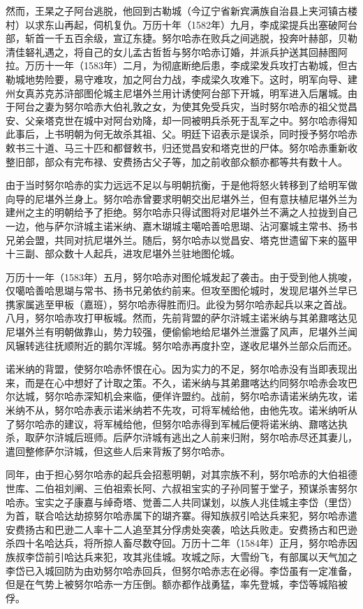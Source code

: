 然而，王杲之子阿台逃脱，他回到古勒城（今辽宁省新宾满族自治县上夹河镇古楼村）以求东山再起，伺机复仇。万历十年（1582年）九月，李成梁提兵出塞破阿台部，斩首一千五百余级，宣辽东捷。努尔哈赤在败兵之间逃脱，投奔叶赫部，贝勒清佳砮礼遇之，将自己的女儿孟古哲哲与努尔哈赤订婚，并派兵护送其回赫图阿拉。万历十一年（1583年）二月，为彻底断绝后患，李成梁发兵攻打古勒城，但古勒城地势险要，易守难攻，加之阿台力战，李成梁久攻难下。这时，明军向导、建州女真苏克苏浒部图伦城主尼堪外兰用计诱使阿台部下开城，明军进入后屠城。由于阿台之妻为努尔哈赤大伯礼敦之女，为使其免受兵灾，当时努尔哈赤的祖父觉昌安、父亲塔克世在城中对阿台劝降，却一同被明兵杀死于乱军之中。努尔哈赤得知此事后，上书明朝为何无故杀其祖、父。明廷下诏表示是误杀，同时授予努尔哈赤敕书三十道、马三十匹和都督敕书，归还觉昌安和塔克世的尸体。努尔哈赤重新收整旧部，部众有完布禄、安费扬古父子等，加之前收部众额亦都等共有数十人。

由于当时努尔哈赤的实力远远不足以与明朝抗衡，于是他将怒火转移到了给明军做向导的尼堪外兰身上。努尔哈赤曾要求明朝交出尼堪外兰，但有意扶植尼堪外兰为建州之主的明朝给予了拒绝。努尔哈赤只得试图将对尼堪外兰不满之人拉拢到自己一边，他与萨尔浒城主诺米纳、嘉木瑚城主噶哈善哈思瑚、沾河寨城主常书、扬书兄弟会盟，共同对抗尼堪外兰。随后，努尔哈赤以觉昌安、塔克世遗留下来的盔甲十三副、部众数十人起兵，进攻尼堪外兰驻地图伦城。

万历十一年（1583年）五月，努尔哈赤对图伦城发起了袭击。由于受到他人挑唆，仅噶哈善哈思瑚与常书、扬书兄弟依约前来。但攻至图伦城时，发现尼堪外兰早已携家属逃至甲板（嘉班），努尔哈赤得胜而归。此役为努尔哈赤起兵以来之首战。八月，努尔哈赤攻打甲板城。然而，先前背盟的萨尔浒城主诺米纳与其弟鼐喀达见尼堪外兰有明朝做靠山，势力较强，便偷偷地给尼堪外兰泄露了风声，尼堪外兰闻风辗转逃往抚顺附近的鹅尔浑城。努尔哈赤再度扑空，遂收尼堪外兰部众后而还。

诺米纳的背盟，使努尔哈赤怀恨在心。因为实力的不足，努尔哈赤没有当即表现出来，而是在心中想好了计取之策。不久，诺米纳与其弟鼐喀达约同努尔哈赤会攻巴尔达城，努尔哈赤深知机会来临，便佯许盟约。战前，努尔哈赤请诺米纳先攻，诺米纳不从，努尔哈赤表示诺米纳若不先攻，可将军械给他，由他先攻。诺米纳听从了努尔哈赤的建议，将军械给他，但努尔哈赤得到军械后便将诺米纳、鼐喀达执杀，取萨尔浒城后班师。后萨尔浒城有逃出之人前来归附，努尔哈赤尽还其妻儿，遣回整修萨尔浒城，但这些人后来背叛了努尔哈赤。

同年，由于担心努尔哈赤的起兵会招惹明朝，对其宗族不利，努尔哈赤的大伯祖德世库、二伯祖刘阐、三伯祖索长阿、六叔祖宝实的子孙同誓于堂子，预谋杀害努尔哈赤。宝实之子康嘉与绰奇塔、觉善二人共同谋划，以族人兆佳城主李岱（里岱）为首，联合哈达劫掠努尔哈赤属下的瑚齐寨。得知族叔引哈达兵来犯，努尔哈赤遣安费扬古和巴逊二人率十二人追至其分俘虏处突袭，哈达兵败走。安费扬古和巴逊杀四十名哈达兵，将所掠人畜尽数夺回。万历十二年（1584年）正月，努尔哈赤因族叔李岱前引哈达兵来犯，攻其兆佳城。攻城之际，大雪纷飞，有部属以天气加之李岱已入城回防为由劝努尔哈赤回兵，但努尔哈赤志在必得。李岱虽有一定准备，但是在气势上被努尔哈赤一方压倒。额亦都作战勇猛，率先登城，李岱等城陷被俘。

